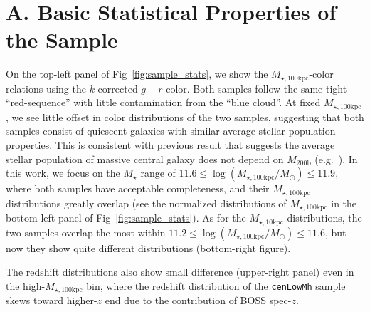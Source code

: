 \documentclass[a4paper,fleqn,usenatbib]{mnras}
\def\nbcg{\texttt{cenLowMh}}
\def\mstar{{$M_{\star}$}}
\def\mhalo{{$M_{\mathrm{200b}}$}}
\def\minn{{$M_{\star,10\mathrm{kpc}}$}}
\def\mtot{{$M_{\star,100\mathrm{kpc}}$}}
\def\logmtot{{$\log (M_{\star,100\mathrm{kpc}}/M_{\odot})$}}
\begin{document}





\appendix
    
\section{A. Basic Statistical Properties of the Sample} 
	\label{app:basic} 
    
    On the top-left panel of Fig~\ref{fig:sample_stats}, we show the \mtot{}-color 
    relations using the $k$-corrected $g-r$ color. 
    Both samples follow the same tight ``red-sequence'' with little contamination 
    from the ``blue cloud''.
    At fixed \mtot{}, we see little offset in color distributions of the two 
    samples, suggesting that both samples consist of quiescent galaxies with 
    similar average stellar population properties.  
    This is consistent with previous result that suggests the average stellar 
    population of massive central galaxy does not depend on \mhalo{} 
    (e.g.\ \citealt{Park2007}).  
    In this work, we focus on the \mstar{} range of $11.6 \le$\logmtot{}$\le 11.9$, 
    where both samples have acceptable completeness, and their \mtot{} distributions 
    greatly overlap (see the normalized distributions of \mtot{} in the bottom-left 
    panel of Fig~\ref{fig:sample_stats}). 
    As for the \minn{} distributions, the two samples overlap the most within 
    $11.2 \le$\logmtot{}$\le 11.6$, but now they show quite different
    distributions (bottom-right figure).
    
    The redshift distributions also show small difference
    (upper-right panel) even in the high-\mtot{} bin, where the redshift distribution 
    of the \nbcg{} sample skews toward higher-$z$ end due to the contribution of BOSS 
    spec-$z$.
    
\end{document}
